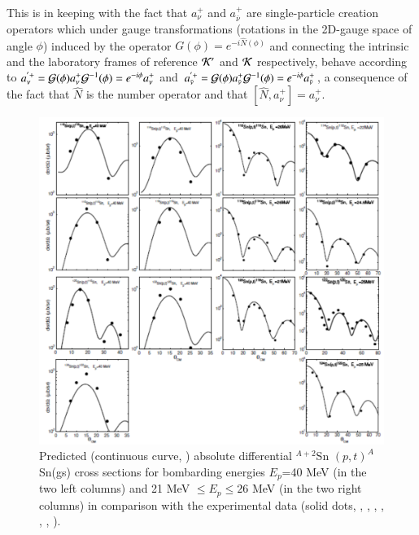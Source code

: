 This is in keeping with the fact that $a^+_{\nu}$ and $a^+_{\bar \nu}$ are single-particle  creation 
operators which under gauge transformations (rotations
in the 2D-gauge space of angle $\phi$) induced by the operator $G(\phi) = e^{- i \hat N (\phi)}$ and connecting the intrinsic and the laboratory frames of reference ${\cal K'}$ and ${\cal K}$ respectively, behave according to 
$a^{'+}_{\nu} = {\cal G} (\phi) a^+_{\nu} {\cal G}^{-1} (\phi)= e^{- i \phi} a^+_{\nu}$ and 
$a^{'+}_{\bar \nu} = {\cal G} (\phi) a^+_{\bar \nu} {\cal G}^{-1} (\phi)= e^{- i \phi} a^+_{\bar \nu}$, a consequence of the fact that $\hat N$ is the number operator and that $[\hat N, a^+_{\nu}] = a^+_{\nu}$.
  \begin{figure}
  \centerline{\includegraphics*[width=12cm,angle=0]{C8/figsC8/fig8_2_4}}
  	\caption{Predicted (continuous curve, \cite{Potel:13,Potel:13b}) absolute differential $^{A+2}$Sn $(p,t)^A$Sn(gs) cross sections for bombarding
  	energies $E_p$=40 MeV (in the two left columns) and 21 MeV $\leq E_p \leq 26$ MeV (in the two right columns) in comparison with the
  	experimental data (solid dots, \cite{Bassani:65}, \cite{Guazzoni:99}, \cite{Guazzoni:04}, \cite{Guazzoni:06}, \cite{Guazzoni:08}, \cite{Guazzoni:11}, \cite{Guazzoni:12}).}\label{fig8_2_4}
  \end{figure}
  



